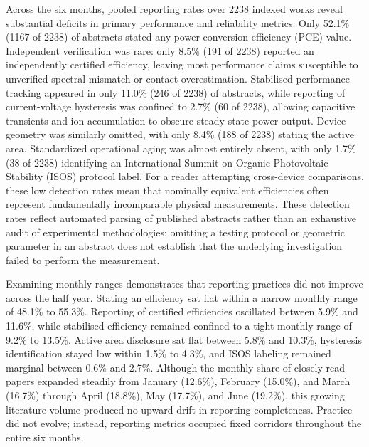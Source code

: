 \documentclass[
  11pt,
]{article}
\begin{document}
Across the six months, pooled reporting rates over 2238 indexed works
reveal substantial deficits in primary performance and reliability
metrics. Only 52.1\% (1167 of 2238) of abstracts stated any power
conversion efficiency (PCE) value. Independent verification was rare:
only 8.5\% (191 of 2238) reported an independently certified efficiency,
leaving most performance claims susceptible to unverified spectral
mismatch or contact overestimation. Stabilised performance tracking
appeared in only 11.0\% (246 of 2238) of abstracts, while reporting of
current-voltage hysteresis was confined to 2.7\% (60 of 2238), allowing
capacitive transients and ion accumulation to obscure steady-state power
output. Device geometry was similarly omitted, with only 8.4\% (188 of
2238) stating the active area. Standardized operational aging was almost
entirely absent, with only 1.7\% (38 of 2238) identifying an
International Summit on Organic Photovoltaic Stability (ISOS) protocol
label. For a reader attempting cross-device comparisons, these low
detection rates mean that nominally equivalent efficiencies often
represent fundamentally incomparable physical measurements. These
detection rates reflect automated parsing of published abstracts rather
than an exhaustive audit of experimental methodologies; omitting a
testing protocol or geometric parameter in an abstract does not
establish that the underlying investigation failed to perform the
measurement.

Examining monthly ranges demonstrates that reporting practices did not
improve across the half year. Stating an efficiency sat flat within a
narrow monthly range of 48.1\% to 55.3\%. Reporting of certified
efficiencies oscillated between 5.9\% and 11.6\%, while stabilised
efficiency remained confined to a tight monthly range of 9.2\% to
13.5\%. Active area disclosure sat flat between 5.8\% and 10.3\%,
hysteresis identification stayed low within 1.5\% to 4.3\%, and ISOS
labeling remained marginal between 0.6\% and 2.7\%. Although the monthly
share of closely read papers expanded steadily from January (12.6\%),
February (15.0\%), and March (16.7\%) through April (18.8\%), May
(17.7\%), and June (19.2\%), this growing literature volume produced no
upward drift in reporting completeness. Practice did not evolve;
instead, reporting metrics occupied fixed corridors throughout the
entire six months.
\end{document}
